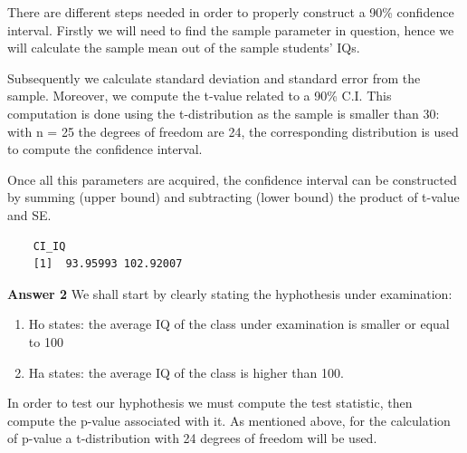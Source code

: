 \documentclass[12pt,letterpaper]{article}
\begin{document}
\noindent There are different steps needed in order to properly construct a 90\% confidence interval. Firstly we will need to find the sample parameter in question, hence we will calculate the sample mean out of the sample students' IQs.\\
\vspace{.5cm}
  
\vspace{.5cm}
\noindent Subsequently we calculate standard deviation and standard error from the sample. Moreover, we compute the t-value related to a 90\% C.I. This computation is done using the t-distribution as the sample is smaller than 30: with n = 25 the degrees of freedom are 24, the corresponding distribution is used to compute the confidence interval. \\
\vspace{.5cm}
  
\vspace{.5cm}
\noindent Once all this parameters are acquired, the confidence interval can be constructed by summing (upper bound) and subtracting (lower bound) the product of t-value and SE. \\
\vspace{.5cm}
  
\vspace{.5cm}
\begin{verbatim}
	CI_IQ
	[1]  93.95993 102.92007
\end{verbatim}
\vspace{1cm}
\textbf{Answer 2}
\noindent We shall start by clearly stating the hyphothesis under examination: \\
\vspace{.5cm}
\begin{enumerate}
	\item Ho states: the average IQ of the class under examination is smaller or equal to 100\\
	
	\item Ha states: the average IQ of the class is higher than 100.\\ 
\end{enumerate}
\vspace{.5cm}
\noindent In order to test our hyphothesis we must compute the test statistic, then compute the p-value associated with it. As mentioned above, for the calculation of p-value a t-distribution with 24 degrees of freedom will be used. \\
\end{document}
